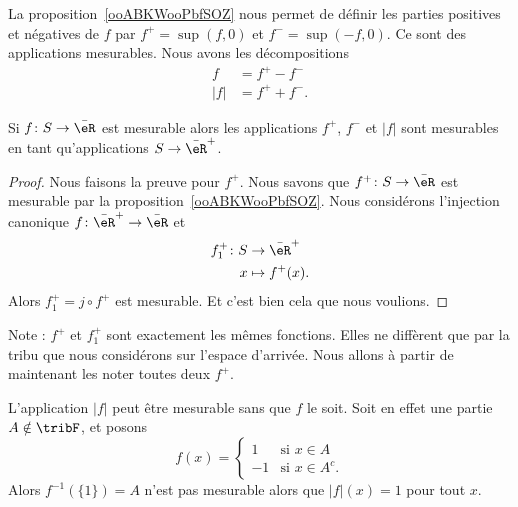 \begin{normaltext}
	La proposition~\ref{ooABKWooPbfSOZ} nous permet de définir les parties positives et négatives de \( f\) par \( f^+=\sup(f,0)\) et \( f^-=\sup(-f,0)\). Ce sont des applications mesurables. Nous avons les décompositions
	\begin{subequations}
		\begin{align}
			f     & = f^+-f^-  \\
			| f | & = f^++f^-.
		\end{align}
	\end{subequations}
\end{normaltext}

\begin{corollary}       \label{CORooNXYUooEcvDlP}
	Si \( f\colon S\to \bar \eR\) est mesurable alors les applications \( f^+\), \( f^-\) et \( | f |\) sont mesurables en tant qu'applications \( S\to\bar \eR^+\).
\end{corollary}

\begin{proof}
	Nous faisons la preuve pour \( f^+\). Nous savons que \( f^+\colon S\to \bar \eR\) est mesurable par la proposition~\ref{ooABKWooPbfSOZ}. Nous considérons l'injection canonique \( f\colon \bar \eR^+\to \bar \eR\) et
	\begin{equation}
		\begin{aligned}
			f_1^+\colon S & \to \bar \eR^+  \\
			x             & \mapsto f^+(x).
		\end{aligned}
	\end{equation}
	Alors \( f_1^+=j\circ f^+\) est mesurable. Et c'est bien cela que nous voulions.

\end{proof}
Note : \( f^+\) et \( f_1^+\) sont exactement les mêmes fonctions. Elles ne diffèrent que par la tribu que nous considérons sur l'espace d'arrivée. Nous allons à partir de maintenant les noter toutes deux \( f^+\).

\begin{remark}
	L'application \( | f |\) peut être mesurable sans que \( f\) le soit. Soit en effet une partie \( A\notin \tribF\), et posons
	\begin{equation}
		f(x)=\begin{cases}
			1  & \text{si } x\in A    \\
			-1 & \text{si } x\in A^c.
		\end{cases}
	\end{equation}
	Alors \( f^{-1}(\{ 1 \})=A\) n'est pas mesurable alors que \( | f |(x)=1\) pour tout \( x\).
\end{remark}

